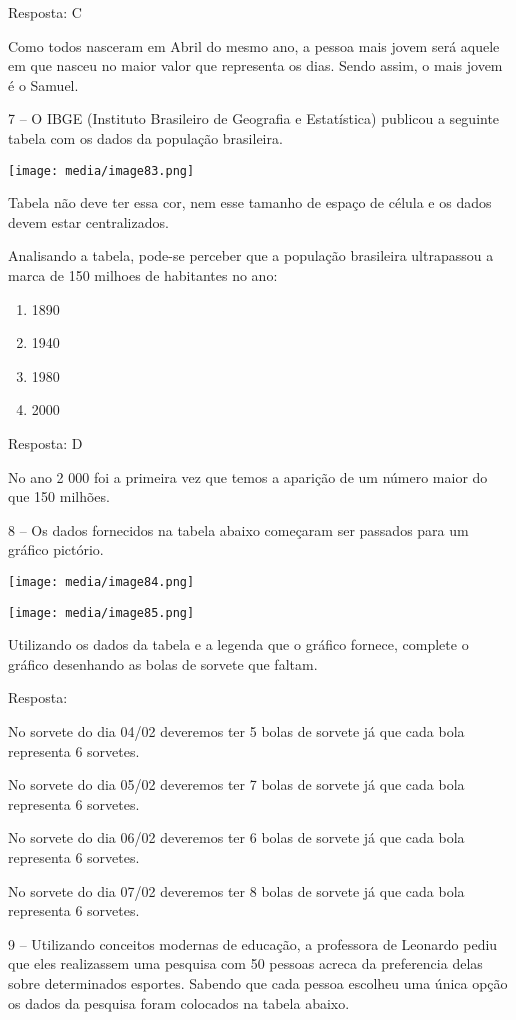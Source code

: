 Resposta: C

Como todos nasceram em Abril do mesmo ano, a pessoa mais jovem será
aquele em que nasceu no maior valor que representa os dias. Sendo assim,
o mais jovem é o Samuel.

7 -- O IBGE (Instituto Brasileiro de Geografia e Estatística) publicou a
seguinte tabela com os dados da população brasileira.

\texttt{[image: media/image83.png]}

Tabela não deve ter essa cor, nem esse tamanho de espaço de célula e os
dados devem estar centralizados.

Analisando a tabela, pode-se perceber que a população brasileira
ultrapassou a marca de 150 milhoes de habitantes no ano:

\begin{enumerate}
\def\labelenumi{\alph{enumi})}
\item
  1890
\item
  1940
\item
  1980
\item
  2000
\end{enumerate}

Resposta: D

No ano 2 000 foi a primeira vez que temos a aparição de um número maior
do que 150 milhões.

8 -- Os dados fornecidos na tabela abaixo começaram ser passados para um
gráfico pictório.

\texttt{[image: media/image84.png]}

\texttt{[image: media/image85.png]}

Utilizando os dados da tabela e a legenda que o gráfico fornece,
complete o gráfico desenhando as bolas de sorvete que faltam.

Resposta:

No sorvete do dia 04/02 deveremos ter 5 bolas de sorvete já que cada
bola representa 6 sorvetes.

No sorvete do dia 05/02 deveremos ter 7 bolas de sorvete já que cada
bola representa 6 sorvetes.

No sorvete do dia 06/02 deveremos ter 6 bolas de sorvete já que cada
bola representa 6 sorvetes.

No sorvete do dia 07/02 deveremos ter 8 bolas de sorvete já que cada
bola representa 6 sorvetes.

9 -- Utilizando conceitos modernas de educação, a professora de Leonardo
pediu que eles realizassem uma pesquisa com 50 pessoas acreca da
preferencia delas sobre determinados esportes. Sabendo que cada pessoa
escolheu uma única opção os dados da pesquisa foram colocados na tabela
abaixo.

